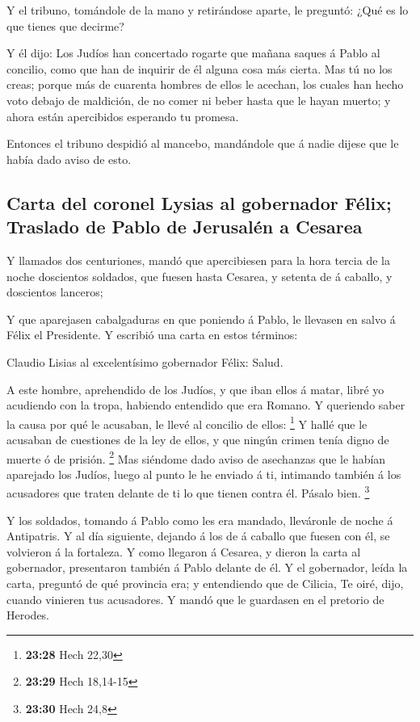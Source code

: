  Y el tribuno, tomándole de la mano y retirándose aparte,
le preguntó: ¿Qué es lo que tienes que decirme?

 Y él dijo: Los Judíos han concertado rogarte que mañana
saques á Pablo al concilio, como que han de inquirir de él alguna cosa
más cierta.  Mas tú no los creas; porque más de cuarenta
hombres de ellos le acechan, los cuales han hecho voto debajo de
maldición, de no comer ni beber hasta que le hayan muerto; y ahora están
apercibidos esperando tu promesa.

 Entonces el tribuno despidió al mancebo, mandándole que
á nadie dijese que le había dado aviso de esto.

\hypertarget{carta-del-coronel-lysias-al-gobernador-fuxe9lix-traslado-de-pablo-de-jerusaluxe9n-a-cesarea}{%
\subsection{Carta del coronel Lysias al gobernador Félix; Traslado de
Pablo de Jerusalén a
Cesarea}\label{carta-del-coronel-lysias-al-gobernador-fuxe9lix-traslado-de-pablo-de-jerusaluxe9n-a-cesarea}}

 Y llamados dos centuriones, mandó que apercibiesen para
la hora tercia de la noche doscientos soldados, que fuesen hasta
Cesarea, y setenta de á caballo, y doscientos lanceros;

 Y que aparejasen cabalgaduras en que poniendo á Pablo,
le llevasen en salvo á Félix el Presidente.  Y escribió
una carta en estos términos:

 Claudio Lisias al excelentísimo gobernador Félix: Salud.

 A este hombre, aprehendido de los Judíos, y que iban
ellos á matar, libré yo acudiendo con la tropa, habiendo entendido que
era Romano.  Y queriendo saber la causa por qué le
acusaban, le llevé al concilio de ellos: \footnote{\textbf{23:28} Hech
  22,30}  Y hallé que le acusaban de cuestiones de la ley
de ellos, y que ningún crimen tenía digno de muerte ó de prisión.
\footnote{\textbf{23:29} Hech 18,14-15}  Mas siéndome
dado aviso de asechanzas que le habían aparejado los Judíos, luego al
punto le he enviado á ti, intimando también á los acusadores que traten
delante de ti lo que tienen contra él. Pásalo bien. \footnote{\textbf{23:30}
  Hech 24,8}

 Y los soldados, tomando á Pablo como les era mandado,
lleváronle de noche á Antipatris.  Y al día siguiente,
dejando á los de á caballo que fuesen con él, se volvieron á la
fortaleza.  Y como llegaron á Cesarea, y dieron la carta
al gobernador, presentaron también á Pablo delante de él.
 Y el gobernador, leída la carta, preguntó de qué
provincia era; y entendiendo que de Cilicia,  Te oiré,
dijo, cuando vinieren tus acusadores. Y mandó que le guardasen en el
pretorio de Herodes.

